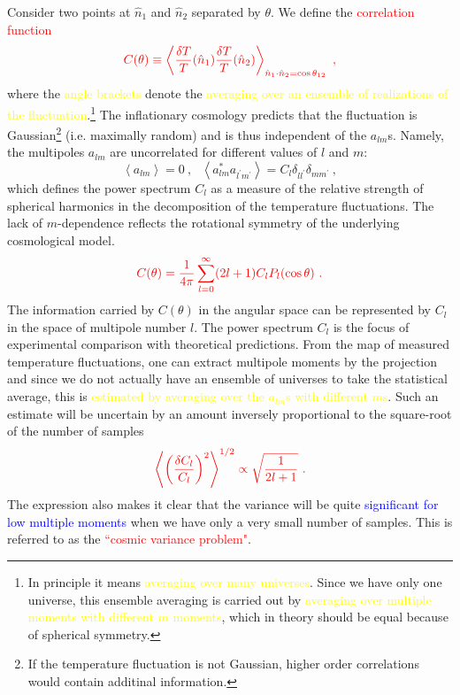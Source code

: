 \documentclass[12pt,a4paper]{article}
\begin{document}
Consider two points at $\hat{n}_1$ and $\hat{n}_2$ separated by $\theta$. We define the \textcolor{red}{correlation function}
\begin{equation}
\color{red} C(\theta) \equiv \left\langle \dfrac{\delta T}{T}(\hat{n}_1) \dfrac{\delta T}{T}(\hat{n}_2) \right\rangle_{\hat{n}_1 \cdot \hat{n}_2 = \cos \theta_{12}} ~, 
\end{equation}
where the \textcolor{yellow}{angle brackets} denote the \textcolor{yellow}{averaging over an ensemble of realizations of the fluctuation}.\footnote{In principle it means \textcolor{yellow}{averaging over many universes}. Since we have only one universe, this ensemble averaging is carried out by \textcolor{yellow}{averaging over multiple moments with different $m$ moments}, which in theory should be equal because of spherical symmetry.} The inflationary cosmology predicts that the fluctuation is Gaussian\footnote{If the temperature fluctuation is not Gaussian, higher order correlations would contain additinal information.} (i.e. maximally random) and is thus independent of the $a_{lm}$s. Namely, the multipoles $a_{lm}$ are uncorrelated for different values of $l$ and $m$:
\begin{equation}
\left\langle a_{lm} \right\rangle = 0  ~, ~~~  \left\langle a^\ast_{lm} a_{l^\prime m^\prime} \right\rangle = C_l \delta_{ll^\prime} \delta_{mm^\prime} ~,
\end{equation}
which defines the power spectrum $C_l$ as a measure of the relative strength of spherical harmonics in the decomposition of the temperature fluctuations. The lack of $m$-dependence reflects the rotational symmetry of the underlying cosmological model. 
\begin{equation}
\color{red} C(\theta) = \dfrac{1}{4\pi} \sum_{l=0}^\infty (2l+1)C_l P_l(\cos \theta) ~.
\end{equation}
The information carried by $C(\theta)$ in the angular space can be represented by $C_l$ in the space of multipole number $l$. The power spectrum $C_l$ is the focus of experimental comparison with theoretical predictions. From
the map of measured temperature fluctuations, one can extract multipole moments by the projection and since we do not actually have an ensemble of universes to take the statistical average, this is \textcolor{yellow}{estimated by averaging over the $a_{lm}$s with different $m$s}. Such an estimate will be uncertain by an amount inversely proportional to the square-root of the number of samples
\begin{equation}
\color{red} \left\langle \left(\dfrac{\delta C_l}{C_l} \right)^2 \right\rangle^{1/2} \propto \sqrt{\dfrac{1}{2l +1}} ~.
\end{equation}
The expression also makes it clear that the variance will be quite \textcolor{blue}{significant for low multiple moments} when we have only a very small number of samples. This is referred to as the \textcolor{red}{``cosmic variance problem"}.
\end{document}
